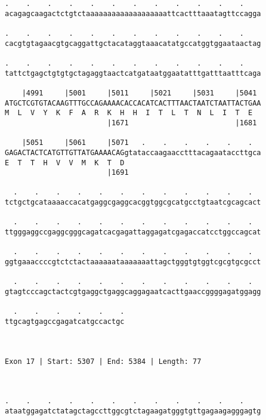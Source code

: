 \documentclass{article}
\begin{document}
\begin{Verbatim}
.    .    .    .    .    .    .    .    .    .    .    .    
acagagcaagactctgtctaaaaaaaaaaaaaaaaaaattcactttaaatagttccagga
                                                            
.    .    .    .    .    .    .    .    .    .    .    .    
cacgtgtagaacgtgcaggattgctacataggtaaacatatgccatggtggaataactag
                                                            
.    .    .    .    .    .    .    .    .    .    .    .    
tattctgagctgtgtgctagaggtaactcatgataatggaatatttgatttaatttcaga
                                                            
    |4991     |5001     |5011     |5021     |5031     |5041 
ATGCTCGTGTACAAGTTTGCCAGAAAACACCACATCACTTTAACTAATCTAATTACTGAA
M  L  V  Y  K  F  A  R  K  H  H  I  T  L  T  N  L  I  T  E  
                        |1671                         |1681 
  
    |5051     |5061     |5071   .    .    .    .    .    .  
GAGACTACTCATGTTGTTATGAAAACAGgtataccaagaacctttacagaataccttgca
E  T  T  H  V  V  M  K  T  D                                
                        |1691                               
  
  .    .    .    .    .    .    .    .    .    .    .    .  
tctgctgcataaaaccacatgaggcgaggcacggtggcgcatgcctgtaatcgcagcact
                                                            
  .    .    .    .    .    .    .    .    .    .    .    .  
ttgggaggccgaggcgggcagatcacgagattaggagatcgagaccatcctggccagcat
                                                            
  .    .    .    .    .    .    .    .    .    .    .    .  
ggtgaaaccccgtctctactaaaaaataaaaaaattagctgggtgtggtcgcgtgcgcct
                                                            
  .    .    .    .    .    .    .    .    .    .    .    .  
gtagtcccagctactcgtgaggctgaggcaggagaatcacttgaaccggggagatggagg
                                                            
  .    .    .    .    .    .
ttgcagtgagccgagatcatgccactgc
                            
                            
 
Exon 17 | Start: 5307 | End: 5384 | Length: 77



.    .    .    .    .    .    .    .    .    .    .    .    
ataatggagatctatagctagccttggcgtctagaagatgggtgttgagaagagggagtg
                                                            

\end{Verbatim}
\end{document}
